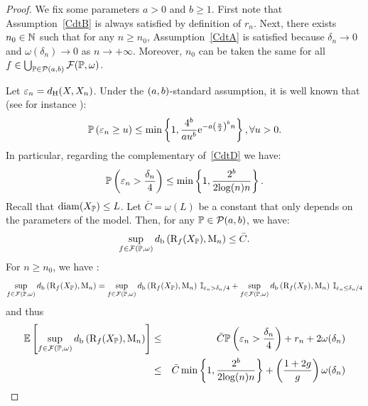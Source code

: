 \begin{proof}
We fix some parameters $a >0$ and $b \geq 1$.  
First note that Assumption~\eqref{CdtB} is always satisfied by definition of $r_n$. 
Next, there exists  $n_0 \in \mathbb{N}$ such that for any $n \geq n_0$,  Assumption~\eqref{CdtA}  %
is satisfied because $\delta_n\rightarrow 0$ and $\omega(\delta_n)\rightarrow 0$ as $n\rightarrow +\infty$.
Moreover, $n_0$ can be taken the same for all $f \in  \bigcup_{\mathbb{P} \in  \mathcal P(a,b)} \mathcal F(\mathbb{P},\omega)$.

Let $\varepsilon_n = d_{\rm H}(X,X_n)$.  
Under the $(a,b)$-standard assumption, it is well known that (see for instance \cite{Chazal15c, Cuevas04}):
\begin{equation}\label{eq:cuevas}
\mathbb{P}\left(\varepsilon_n\geq u\right) \leq \min\left\{1, \frac{4^b}{a u^b}{\rm e}^{-a\left(\frac{u}{2}\right)^b n}\right\}, \forall u > 0.
\end{equation}
In particular, regarding the complementary of~\eqref{CdtD} we have:
\begin{equation} \label{contrCondD}
\mathbb{P}\left( {\varepsilon_n > \frac{\delta_n}{4}} \right) \leq \min\left\{1,\frac{2^b}{2{\log}(n)n}\right\}.
\end{equation}
Recall that ${\rm diam}(X_{\mathbb{P}})\leq L$.
Let $\bar C = \omega(L)$ be a constant that only depends on the parameters of the model. 
Then, for any $\mathbb{P} \in \mathcal P(a,b)$, we have:
\begin{equation} \label{bornetotpers}
\sup_{f \in \mathcal F(\mathbb{P},\omega)} d_{\rm b} \left(\mathrm{R}_f(X_{\mathbb{P}}),\mathrm{M}_n\right) \leq \bar C .
\end{equation}
For $n \geq n_0$, we have :
\begin{equation*}
 \sup_{f \in \mathcal F(\mathbb{P},\omega)}  d_{\rm b}\left(\mathrm{R}_f(X_{\mathbb{P}}),\mathrm{M}_n\right)   = 
 \sup_{f \in \mathcal F(\mathbb{P},\omega)} d_{\rm b}\left( \mathrm{R}_f(X_{\mathbb{P}}),\mathrm{M}_n   \right)  \: \mathbb I_{\varepsilon_n  >  \delta_n / 4 }  
+\sup_{f \in \mathcal F(\mathbb{P},\omega)} d_{\rm b}\left( \mathrm{R}_f(X_{\mathbb{P}}),\mathrm{M}_n  \right)  \: \mathbb I _{\varepsilon_n  \leq \delta_n / 4 }  
 \end{equation*}
and thus 
\begin{eqnarray}
\E \left[\sup_{f \in \mathcal F(\p,\omega)}  \dper\left(\Reeb_f(\Xset_\p),\Map_n\right)\right] & \leq & 
 \bar C  \proba{\varepsilon_n > \frac{\delta_n}{4} }  +  %
r_n + 2 \omega(\delta_n)  %
\notag \\
& \leq &  \bar C  \min\left\{1,\frac{2^\dimension}{2{\log}(n)n}\right\}  +  \left(\frac{1+2g}{g}\right)\omega(\delta_n)   \label{majdinf}

\end{eqnarray}
\end{proof}
